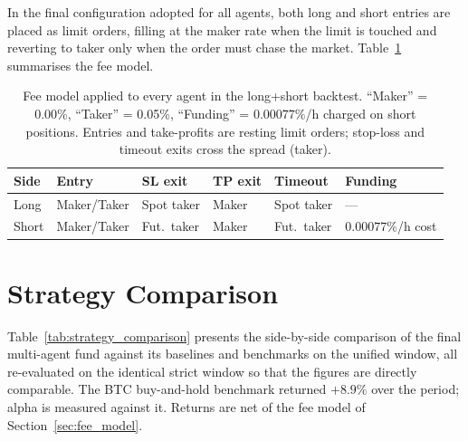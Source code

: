 In the final configuration adopted for all agents, both long and short entries are placed as limit orders, filling at the maker rate when the limit is touched and reverting to taker only when the order must chase the market. Table~\ref{tab:fee_summary} summarises the fee model.

\begin{table}[h!]
    \centering
    \caption{Fee model applied to every agent in the long+short backtest. ``Maker'' = 0.00\%, ``Taker'' = 0.05\%, ``Funding'' = $0.00077\%$/h charged on short positions. Entries and take-profits are resting limit orders; stop-loss and timeout exits cross the spread (taker).}
    \label{tab:fee_summary}
    \begin{tabular}{llllll}
        \toprule
        \textbf{Side} & \textbf{Entry} & \textbf{SL exit} & \textbf{TP exit} & \textbf{Timeout} & \textbf{Funding} \\
        \midrule
        Long  & Maker/Taker & Spot taker  & Maker & Spot taker & --- \\
        Short & Maker/Taker & Fut.\ taker & Maker & Fut.\ taker & $0.00077\%$/h cost \\
        \bottomrule
    \end{tabular}
\end{table}

\section{Strategy Comparison}
\label{sec:strategy_comparison}

Table~\ref{tab:strategy_comparison} presents the side-by-side comparison of the final multi-agent fund against its baselines and benchmarks on the unified window, all re-evaluated on the identical strict window so that the figures are directly comparable. The BTC buy-and-hold benchmark returned $+8.9\%$ over the period; alpha is measured against it. Returns are net of the fee model of Section~\ref{sec:fee_model}.

